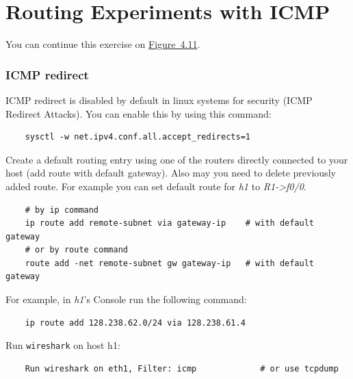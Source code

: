 \documentclass{UTNetLab}
\begin{document}
\part{Routing Experiments with ICMP}

You can continue this exercise on \hyperref[fig:4.11]{Figure~4.11}.

\section{ICMP redirect}
    ICMP redirect is disabled by default in linux systems for security (ICMP Redirect Attacks).
    You can enable this by using this command:

    \begin{lstlisting}
    sysctl -w net.ipv4.conf.all.accept_redirects=1
    \end{lstlisting}

    Create a default routing entry using one of the routers directly connected to your host (add route with default gateway).
    Also may you need to delete previously added route.
    For example you can set default route for \textit{h1} to \textit{R1->f0/0}.

    \begin{lstlisting}
    # by ip command
    ip route add remote-subnet via gateway-ip    # with default gateway
    # or by route command
    route add -net remote-subnet gw gateway-ip   # with default gateway
    \end{lstlisting}
    
For example, in \textit{h1}'s Console run the following command:

    \begin{lstlisting}
    ip route add 128.238.62.0/24 via 128.238.61.4   
    \end{lstlisting}
    
Run \lstinline{wireshark} on host h1:

    \begin{lstlisting}
    Run wireshark on eth1, Filter: icmp             # or use tcpdump
    \end{lstlisting}
\end{document}
